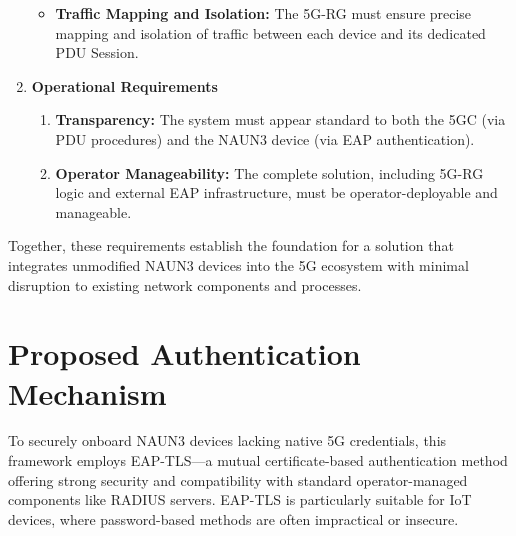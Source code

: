\begin{enumerate}
{\begin{itemize}
{                \textbf{Lifecycle Management:} The \ac{5G-RG} must manage each device's session from initial authentication to disconnection, including re-authentication and \ac{PDU} Session teardown.
            }
            \item {
                \textbf{Traffic Mapping and Isolation:} The \ac{5G-RG} must ensure precise mapping and isolation of traffic between each device and its dedicated \ac{PDU} Session.
            }
        \end{itemize}
    }
    \item {
        \textbf{Operational Requirements}
        \begin{enumerate}
            \item {
                \textbf{Transparency:} The system must appear standard to both the \ac{5GC} (via \ac{PDU} procedures) and the \ac{NAUN3} device (via \ac{EAP} authentication).
            }
            \item {
                \textbf{Operator Manageability:} The complete solution, including \ac{5G-RG} logic and external \ac{EAP} infrastructure, must be operator-deployable and manageable.
            }
        \end{enumerate}
    }
\end{enumerate}

Together, these requirements establish the foundation for a solution that integrates unmodified \ac{NAUN3} devices into the \ac{5G} ecosystem with minimal disruption to existing network components and processes.


\section{Proposed Authentication Mechanism}

To securely onboard \ac{NAUN3} devices lacking native \ac{5G} credentials, this framework employs \ac{EAP-TLS}—a mutual certificate-based authentication method offering strong security and compatibility with standard operator-managed components like \ac{RADIUS} servers. \ac{EAP-TLS} is particularly suitable for \ac{IoT} devices, where password-based methods are often impractical or insecure.

